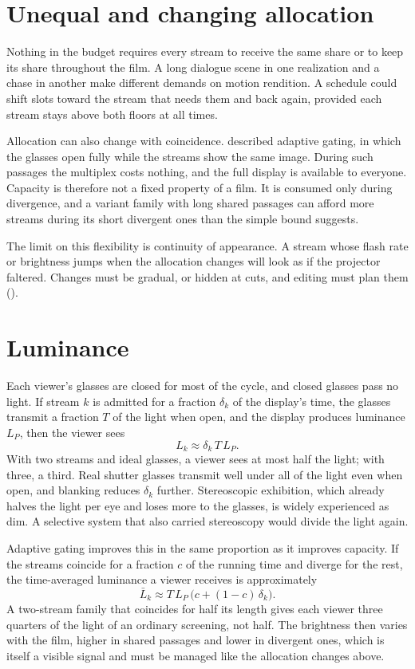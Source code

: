 \section{Unequal and changing allocation}

Nothing in the budget requires every stream to receive the same share or to keep its share throughout the film. A long dialogue scene in one realization and a chase in another make different demands on motion rendition. A schedule could shift slots toward the stream that needs them and back again, provided each stream stays above both floors at all times.

Allocation can also change with coincidence.  described adaptive gating, in which the glasses open fully while the streams show the same image. During such passages the multiplex costs nothing, and the full display is available to everyone. Capacity is therefore not a fixed property of a film. It is consumed only during divergence, and a variant family with long shared passages can afford more streams during its short divergent ones than the simple bound suggests.

The limit on this flexibility is continuity of appearance. A stream whose flash rate or brightness jumps when the allocation changes will look as if the projector faltered. Changes must be gradual, or hidden at cuts, and editing must plan them ().

\section{Luminance}

Each viewer's glasses are closed for most of the cycle, and closed glasses pass no light. If stream $k$ is admitted for a fraction $\delta_k$ of the display's time, the glasses transmit a fraction $T$ of the light when open, and the display produces luminance $L_P$, then the viewer sees
\begin{equation}
L_k\approx \delta_k\,T\,L_P.
\end{equation}
With two streams and ideal glasses, a viewer sees at most half the light; with three, a third. Real shutter glasses transmit well under all of the light even when open, and blanking reduces $\delta_k$ further. Stereoscopic exhibition, which already halves the light per eye and loses more to the glasses, is widely experienced as dim. A selective system that also carried stereoscopy would divide the light again.

Adaptive gating improves this in the same proportion as it improves capacity. If the streams coincide for a fraction $c$ of the running time and diverge for the rest, the time-averaged luminance a viewer receives is approximately
\begin{equation}
\bar L_k\approx T\,L_P\,\big(c+(1-c)\,\delta_k\big).
\end{equation}
A two-stream family that coincides for half its length gives each viewer three quarters of the light of an ordinary screening, not half. The brightness then varies with the film, higher in shared passages and lower in divergent ones, which is itself a visible signal and must be managed like the allocation changes above.


